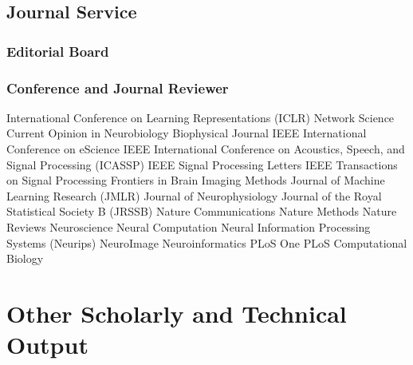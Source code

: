 \documentclass[10pt,colorlinks=true,urlcolor=blue]{moderncv}
\begin{document}
\subsection{Journal Service}

\subsubsection{Editorial Board}

\subsubsection{Conference and Journal Reviewer}
    \cventry {} {International Conference on Learning Representations (ICLR)} {}{}{}{}
    \cventry {} {Network Science} {}{}{}{}
    \cventry {} {Current Opinion in Neurobiology} {}{}{}{}
    \cventry {} {Biophysical Journal} {}{}{}{}
    \cventry {} {IEEE International Conference on eScience} {}{}{}{}
    \cventry {} {IEEE International Conference on Acoustics, Speech, and Signal Processing (ICASSP)}{}{}{}{}
    \cventry {} {IEEE Signal Processing Letters} {} {} {} {}
    \cventry {} {IEEE Transactions on Signal Processing} {}{}{}{}
    \cventry {} {Frontiers in Brain Imaging Methods} {}{}{}{}
    \cventry {} {Journal of Machine Learning Research (JMLR)} {}{}{}{}
    \cventry {} {Journal of Neurophysiology} {}{}{}{}
    \cventry {} {Journal of the Royal Statistical Society B (JRSSB)} {}{}{}{}
    \cventry {} {Nature Communications} {}{}{}{}
    \cventry {} {Nature Methods} {}{}{}{}
    \cventry {} {Nature Reviews Neuroscience} {}{}{}{}
    \cventry {} {Neural Computation} {}{}{}{}
    \cventry {} {Neural Information Processing Systems (Neurips)} {}{}{}{}
    \cventry {} {NeuroImage} {}{}{}{}
    \cventry {} {Neuroinformatics} {}{}{}{}
    \cventry {} {PLoS One} {}{}{}{}
    \cventry {} {PLoS Computational Biology} {}{}{}{}


\section{Other Scholarly and Technical Output}
\end{document}
